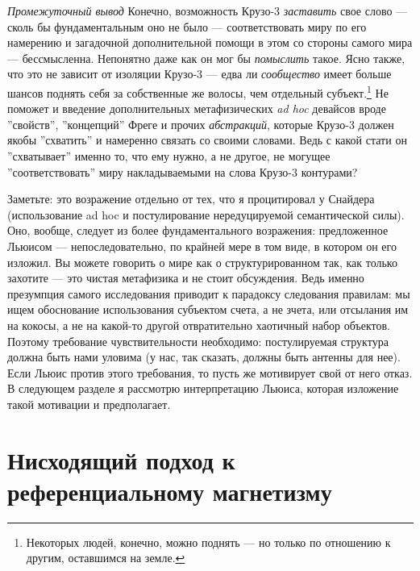 \documentclass[11pt]{book}
\begin{document}
\textit{Промежуточный вывод} \quad Конечно, возможность Крузо-3 \textit{заставить} свое слово --- сколь бы фундаментальным оно не было --- соответствовать миру по его намерению и загадочной дополнительной помощи в этом со стороны самого мира --- бессмысленна. Непонятно даже как он мог бы \textit{помыслить} такое. Ясно также, что это не зависит от изоляции Крузо-3 --- едва ли \textit{сообщество} имеет больше шансов поднять себя за собственные же волосы, чем отдельный субъект.\footnote{Некоторых людей, конечно, можно поднять --- но только по отношению к другим, оставшимся на земле.} Не поможет и введение дополнительных метафизических \textit{ad hoc} девайсов вроде ''свойств'', ''концепций'' Фреге и прочих \textit{абстракций}, которые Крузо-3 должен якобы ''схватить'' и намеренно связать со своими словами. Ведь с какой стати он ''схватывает'' именно то, что ему нужно, а не другое, не могущее ''соответствовать'' миру накладываемыми на слова Крузо-3 контурами?

Заметьте: это возражение отдельно от тех, что я процитировал у Снайдера (использование ad hoc и постулирование нередуцируемой семантической силы). Оно, вообще, следует из более фундаментального возражения: предложенное Льюисом --- непоследовательно, по крайней мере в том виде, в котором он его изложил. Вы можете говорить о мире как о структурированном так, как только захотите --- это чистая метафизика и не стоит обсуждения. Ведь именно презумпция самого исследования приводит к парадоксу следования правилам: мы ищем обоснование использования субъектом счета, а не зчета, или отсылания им на кокосы, а не на какой-то другой отвратительно хаотичный набор объектов. Поэтому требование чувствительности необходимо: постулируемая структура должна быть нами уловима (у нас, так сказать, должны быть антенны для нее). Если Льюис против этого требования, то пусть же мотивирует свой от него отказ. В следующем разделе я рассмотрю интерпретацию Льюиса, которая изложение такой мотивации и предполагает.

\section{Нисходящий подход к референциальному магнетизму}
\end{document}
